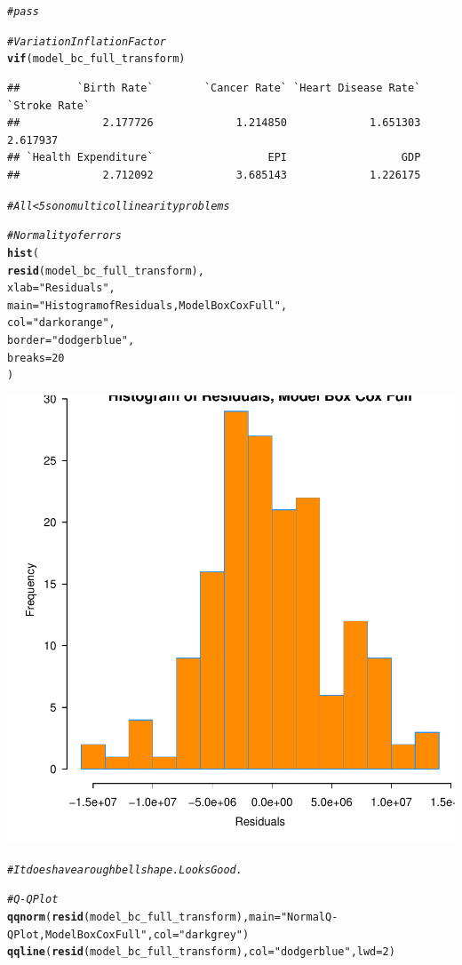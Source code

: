 \documentclass{article}\usepackage[]{graphicx}\usepackage[]{color}
\makeatletter
\newcommand{\hlnum}[1]{\textcolor[rgb]{0.686,0.059,0.569}{#1}}%
\newcommand{\hlstr}[1]{\textcolor[rgb]{0.192,0.494,0.8}{#1}}%
\newcommand{\hlcom}[1]{\textcolor[rgb]{0.678,0.584,0.686}{\textit{#1}}}%
\newcommand{\hlstd}[1]{\textcolor[rgb]{0.345,0.345,0.345}{#1}}%
\newcommand{\hlkwc}[1]{\textcolor[rgb]{0.333,0.667,0.333}{#1}}%
\newcommand{\hlkwd}[1]{\textcolor[rgb]{0.737,0.353,0.396}{\textbf{#1}}}%
\newenvironment{kframe}{%
 \def\at@end@of@kframe{}%
 \ifinner\ifhmode%
  \def\at@end@of@kframe{\end{minipage}}%
  \begin{minipage}{\columnwidth}%
 \fi\fi%
 \def\FrameCommand##1{\hskip\@totalleftmargin \hskip-\fboxsep
 \colorbox{shadecolor}{##1}\hskip-\fboxsep
     \hskip-\linewidth \hskip-\@totalleftmargin \hskip\columnwidth}%
 \MakeFramed {\advance\hsize-\width
   \@totalleftmargin\z@ \linewidth\hsize
   \@setminipage}}%
 {\par\unskip\endMakeFramed%
 \at@end@of@kframe}
\newenvironment{knitrout}{}{} %
\makeatother
\begin{document}
\begin{knitrout}
{}


\begin{kframe}\begin{alltt}
\hlcom{# pass}

\hlcom{# Variation Inflation Factor}
\hlkwd{vif}\hlstd{(model_bc_full_transform)}
\end{alltt}
\begin{verbatim}
##         `Birth Rate`        `Cancer Rate` `Heart Disease Rate`        `Stroke Rate` 
##             2.177726             1.214850             1.651303             2.617937 
## `Health Expenditure`                  EPI                  GDP 
##             2.712092             3.685143             1.226175
\end{verbatim}
\begin{alltt}
\hlcom{# All <5 so no multicollinearity problems}

\hlcom{# Normality of errors}
\hlkwd{hist}\hlstd{(}
  \hlkwd{resid}\hlstd{(model_bc_full_transform),}
  \hlkwc{xlab}   \hlstd{=} \hlstr{"Residuals"}\hlstd{,}
  \hlkwc{main}   \hlstd{=} \hlstr{"Histogram of Residuals, Model Box Cox Full"}\hlstd{,}
  \hlkwc{col}    \hlstd{=} \hlstr{"darkorange"}\hlstd{,}
  \hlkwc{border} \hlstd{=} \hlstr{"dodgerblue"}\hlstd{,}
  \hlkwc{breaks} \hlstd{=} \hlnum{20}
\hlstd{)}
\end{alltt}
\end{kframe}

{\centering \includegraphics[width=.6\linewidth]{figure/Analysis-Rnwauto-report-30} 

}


\begin{kframe}\begin{alltt}
\hlcom{# It does have a rough bell shape. Looks Good.}

\hlcom{# Q-Q Plot}
\hlkwd{qqnorm}\hlstd{(}\hlkwd{resid}\hlstd{(model_bc_full_transform),} \hlkwc{main} \hlstd{=} \hlstr{"Normal Q-Q Plot, Model Box Cox Full"}\hlstd{,} \hlkwc{col} \hlstd{=} \hlstr{"darkgrey"}\hlstd{)}
\hlkwd{qqline}\hlstd{(}\hlkwd{resid}\hlstd{(model_bc_full_transform),} \hlkwc{col} \hlstd{=} \hlstr{"dodgerblue"}\hlstd{,} \hlkwc{lwd} \hlstd{=} \hlnum{2}\hlstd{)}
\end{alltt}
\end{kframe}


\end{knitrout}
\end{document}
